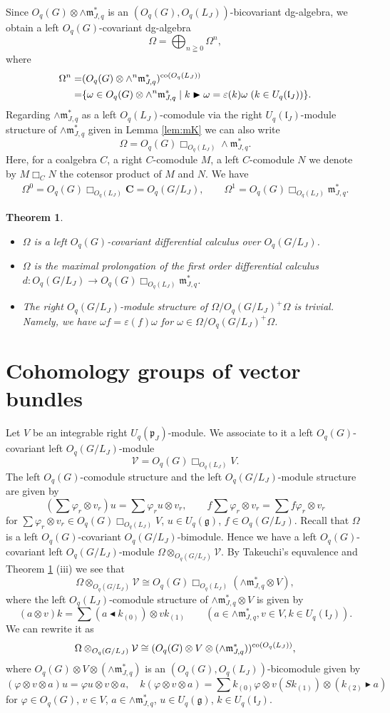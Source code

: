 \documentclass[a4paper, 12pt, leqno]{amsart}
\newtheorem{theorem}[lemma]{{\sc Theorem}}
\theoremstyle{definition}
\numberwithin{equation}{section}
\def\Gg{{\mathfrak{g}}}
\def\Gl{{\mathfrak{l}}}
\def\Gm{{\mathfrak{m}}}
\def\Gp{{\mathfrak{p}}}
\def\BC{{\mathbf{C}}}
\def\CV{{\mathcal V}}
\def\co{\mathop{\rm co}\nolimits}
\def\m{\Gm_{J,q}}
\def\K{U_q(\Gl_J)}
\def\F{O_q(G/L_J)}
\def\al{\blacktriangleleft}
\def\ar{\blacktriangleright}
\begin{document}
Since $O_q(G)\otimes\wedge\m^*$ is an $(O_q(G),O_q(L_J))$-bicovariant dg-algebra, we obtain a left $O_q(G)$-covariant dg-algebra
\[
\Omega=\bigoplus_{n\geqq0}\Omega^n,
\]
where
\begin{align*}
\Omega^n=&(O_q(G)\otimes\wedge^n\m^*)^{\co(O_q(L_J))}
\\
=&
\{\omega\in O_q(G)\otimes\wedge^n\m^*\mid
k\ar\omega=\varepsilon(k)\omega\;(k\in\K)\}.
\end{align*}
Regarding $\wedge\m^*$ as a left $O_q(L_J)$-comodule via
the right $\K$-module structure of $\wedge\m^*$ given in Lemma \ref{lem:mK} we can also write
\[
\Omega
=
O_q(G)\Box_{O_q(L_J)}\wedge\m^*.
\]
Here, for a coalgebra $C$, a right $C$-comodule $M$, a left $C$-comodule $N$ we denote by $M\Box_CN$ the cotensor product of $M$ and $N$.
We have 
\begin{align*}
\Omega^0=
O_q(G)\Box_{O_q(L_J)}\BC=\F,
\qquad
\Omega^1=
O_q(G)\Box_{O_q(L_J)}\m^*.
\end{align*}


\begin{theorem}
\label{thm:2}
\begin{itemize}
\item[(i)]
$\Omega$ is a left $O_q(G)$-covariant differential calculus over $\F$.
\item[(ii)]
$\Omega$ is the maximal prolongation of the first order differential calculus 
$d:\F\to O_q(G)\Box_{O_q(L_J)}\m^*$.
\item[(iii)]
The right $\F$-module structure of $\Omega/\F^+\Omega$ is trivial.
Namely, we have
$\omega f=\varepsilon(f)\omega$ for $\omega\in\Omega/\F^+\Omega$.
\end{itemize}
\end{theorem}
\section{Cohomology groups of vector bundles}
Let $V$ be an integrable right $U_q(\Gp_J)$-module.
We associate to it a left $O_q(G)$-covariant left $\F$-module
\[
\CV=O_q(G)\Box_{O_q(L_J)}V.
\]
The left $O_q(G)$-comodule structure and the left $\F$-module structure are given by
\[
(\sum\varphi_r\otimes v_r)u=
\sum\varphi_ru\otimes v_r,\qquad
f\sum\varphi_r\otimes v_r=\sum f\varphi_r\otimes v_r
\]
for $\sum\varphi_r\otimes v_r\in O_q(G)\Box_{O_q(L_J)}V$, 
$u\in U_q(\Gg)$, $f\in\F$.
Recall that $\Omega$ is a left $O_q(G)$-covariant $\F$-bimodule.
Hence we have a left $O_q(G)$-covariant left $\F$-module 
$\Omega\otimes_{\F}\CV$.
By Takeuchi's equvalence \cite{Tak} and Theorem \ref{thm:2} (iii) we see that
\[
\Omega\otimes_{\F}\CV\cong 
O_q(G)\Box_{O_q(L_J)}(\wedge\m^*\otimes V),
\]
where the left $O_q(L_J)$-comodule structure of 
$\wedge\m^*\otimes V$ is given by 
\[
(a\otimes v)k=\sum (a\al k_{(0)})\otimes v k_{(1)}
\qquad
(a\in \wedge\m^*, v\in V, k\in\K).
\]
We can rewrite it as 
\[
\Omega\otimes_{\F}\CV\cong 
(O_q(G)\otimes V\otimes(\wedge\m^*))^{\co(O_q(L_J))},
\]
where $O_q(G)\otimes V\otimes(\wedge\m^*)$ is an 
$(O_q(G),O_q(L_J))$-bicomodule 
given by
\[
(\varphi\otimes v\otimes a)u
=\varphi u\otimes v\otimes a,\quad
k(\varphi\otimes v\otimes a)
=\sum k_{(0)}\varphi\otimes v(Sk_{(1)})\otimes (k_{(2)}\ar a)
\]
for
$\varphi\in O_q(G)$, $v\in V$, $a\in\wedge\m^*$, $u\in U_q(\Gg)$, $k\in\K$.
\end{document}
